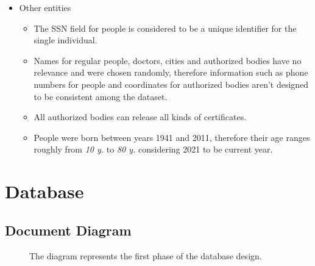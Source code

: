\documentclass[12pt, a4paper]{article}
\begin{document}
\begin{itemize}
    \item Other entities
    \begin{itemize}
        \item[] The SSN field for people is considered to be a unique
            identifier for the single individual.
        \item[] Names for regular people, doctors, cities and authorized bodies 
            have no relevance and were chosen randomly, therefore information 
            such as phone numbers for people and coordinates for authorized 
            bodies aren't designed to be consistent among the dataset.
        \item[] All authorized bodies can release all kinds of certificates.
        \item[] People were born between years 1941 and 2011, therefore their 
            age ranges roughly from \emph{10 y.} to \emph{80 y.} considering 
            2021 to be current year.
    \end{itemize}

\end{itemize}
  
\clearpage

\section{Database}

\subsection{Document Diagram}
\begin{figure}[h]
    \caption*{The diagram represents the first phase of the database design.} %
\end{figure}
\end{document}
